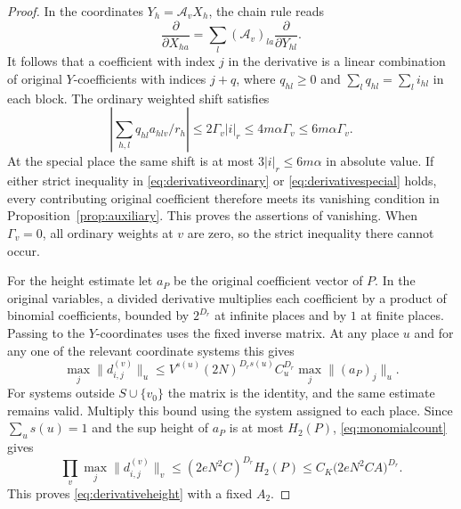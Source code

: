 \documentclass[11pt]{article}
\numberwithin{equation}{section}
\theoremstyle{remark}\newtheorem{remark}[theorem]{Remark}
\begin{document}
\begin{proof}
In the coordinates $Y_h=\mathscr A_vX_h$, the chain rule reads
\[
 \frac{\partial}{\partial X_{ha}}
 =\sum_l(\mathscr A_v)_{la}\frac{\partial}{\partial Y_{hl}}.
\]
It follows that a coefficient with index $j$ in the derivative
is a linear combination of original $Y$-coefficients with indices
$j+q$, where $q_{hl}\ge0$ and
$\sum_lq_{hl}=\sum_li_{hl}$ in each block. The ordinary weighted
shift satisfies
\[
 \left|\sum_{h,l}q_{hl}a_{hlv}/r_h\right|
 \le2\Gamma_v|i|_r\le4m\alpha\Gamma_v
 \le6m\alpha\Gamma_v.
\]
At the special place the same shift is at most
$3|i|_r\le6m\alpha$ in absolute value.
If either strict inequality in \eqref{eq:derivativeordinary} or
\eqref{eq:derivativespecial} holds, every contributing original
coefficient therefore meets its vanishing condition in
Proposition~\ref{prop:auxiliary}. This proves the assertions of
vanishing. When $\Gamma_v=0$, all ordinary weights at $v$ are zero,
so the strict inequality there cannot occur.

For the height estimate let $a_P$ be the original coefficient vector
of $P$. In the original variables, a divided derivative multiplies
each coefficient by a product of binomial coefficients, bounded by
$2^{D_r}$ at infinite places and by $1$ at finite places. Passing
to the $Y$-coordinates uses the fixed inverse matrix. At any place $u$
and for any one of the relevant coordinate systems this gives
\[
 \max_j\|d^{(v)}_{i,j}\|_u
 \le V^{s(u)}(2N)^{D_rs(u)}C_u^{D_r}
                       \max_j\|(a_P)_j\|_u.
\]
For systems outside $S\cup\{v_0\}$ the matrix is the identity, and
the same estimate remains valid. Multiply this bound using the
system assigned to each place. Since $\sum_us(u)=1$ and the sup
height of $a_P$ is at most $H_2(P)$, \eqref{eq:monomialcount} gives
\[
 \prod_v\max_j\|d^{(v)}_{i,j}\|_v
 \le(2eN^2C)^{D_r}H_2(P)
 \le C_K\bigl(2eN^2CA\bigr)^{D_r}.
\]
This proves \eqref{eq:derivativeheight} with a fixed $A_2$.
\end{proof}
\end{document}
